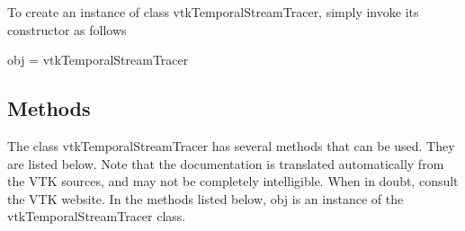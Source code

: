 To create an instance of class vtk\-Temporal\-Stream\-Tracer, simply invoke its constructor as follows \begin{DoxyVerb}  obj = vtkTemporalStreamTracer
\end{DoxyVerb}
 \hypertarget{vtkwidgets_vtkxyplotwidget_Methods}{}\subsection{Methods}\label{vtkwidgets_vtkxyplotwidget_Methods}
The class vtk\-Temporal\-Stream\-Tracer has several methods that can be used. They are listed below. Note that the documentation is translated automatically from the V\-T\-K sources, and may not be completely intelligible. When in doubt, consult the V\-T\-K website. In the methods listed below, {\ttfamily obj} is an instance of the vtk\-Temporal\-Stream\-Tracer class. 
